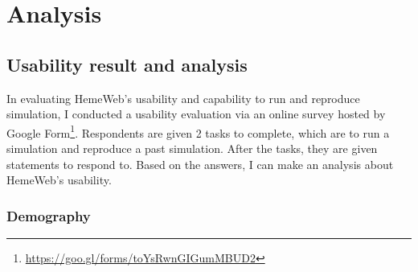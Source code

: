  

\chapter[Analysis]{Analysis}

\section{Usability result and analysis}

In evaluating HemeWeb's usability and capability to run and reproduce simulation, I conducted a usability evaluation via an online survey hosted by Google Form\footnote{\url{https://goo.gl/forms/toYsRwnGIGumMBUD2}}. Respondents are given 2 tasks to complete, which are to run a simulation and reproduce a past simulation. After the tasks, they are given statements to respond to. Based on the answers, I can make an analysis about HemeWeb's usability.


\subsection{Demography}


\vspace{0.5cm}

\noindent%
\begin{minipage}{\linewidth}%
 \label{fig:survey-career}%
\end{minipage}

